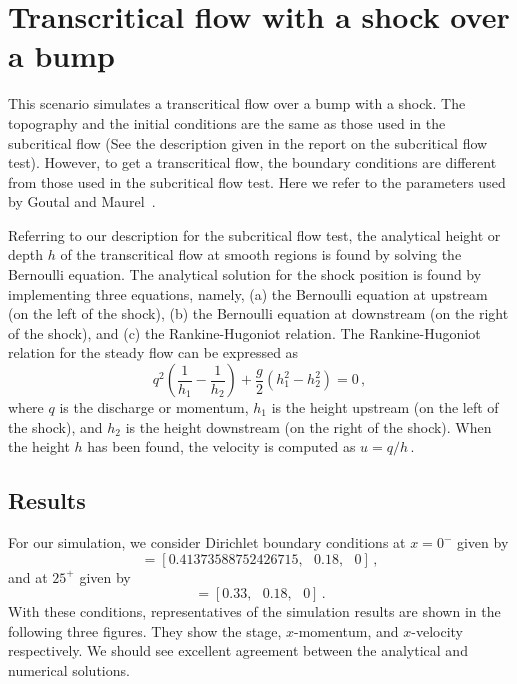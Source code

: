 
\section{Transcritical flow with a shock over a bump}

This scenario simulates a transcritical flow over a bump with a shock. The topography and the initial conditions are the same as those used in the subcritical flow (See the description given in the report on the subcritical flow test). However, to get a transcritical flow, the boundary conditions are different from those used in the subcritical flow test. Here we refer to the parameters used by Goutal and Maurel~\cite{GM1997}.

Referring to our description for the subcritical flow test, the analytical height or depth $h$ of the transcritical flow at smooth regions is found by solving the Bernoulli equation. The analytical solution for the shock position is found by implementing three equations, namely, (a) the Bernoulli equation at upstream (on the left of the shock), (b) the Bernoulli equation at downstream (on the right of the shock), and (c) the Rankine-Hugoniot relation. The Rankine-Hugoniot relation for the steady flow can be expressed as
\begin{equation}
q^2 \left( \frac{1}{h_1} - \frac{1}{h_2} \right) + \frac{g}{2} \left(h_1^2 - h_2^2\right) = 0\,,
\end{equation}
where $q$ is the discharge or momentum, $h_1$ is the height upstream (on the left of the shock), and $h_2$ is the height downstream (on the right of the shock). When the height $h$ has been found, the velocity is computed as $u=q/h$\,.

\subsection{Results}
For our simulation, we consider Dirichlet boundary conditions
at $x=0^{-}$ given by
\begin{equation}
[w,hu,hv]=[0.41373588752426715,~~~0.18,~~~0]\,,
\end{equation}
and at $25^{+}$ given by
\begin{equation}
[w,hu,hv]=[0.33,~~~0.18,~~~0]\,.
\end{equation}
With these conditions, representatives of the simulation results are shown in the following three figures. They show the stage, $x$-momentum, and $x$-velocity respectively. We should see excellent agreement between the analytical and numerical solutions.

